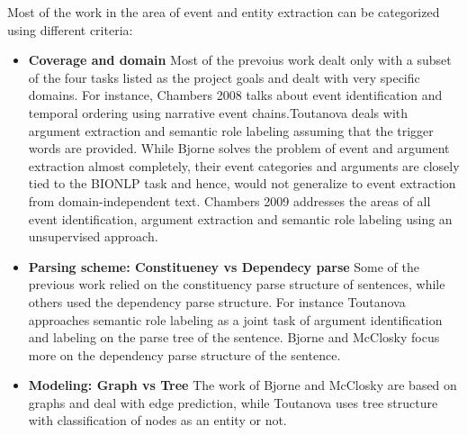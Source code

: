 Most of the work in the area of event and entity extraction can be categorized using different criteria:

\begin{itemize}

\item {\bf Coverage and domain} Most of the prevoius work dealt only with a subset of the four tasks listed as the project goals and dealt with very specific domains. For instance, Chambers 2008 talks about event identification and temporal ordering using narrative event chains.Toutanova deals with argument extraction and semantic role labeling assuming that the trigger words are provided. While Bjorne solves the problem of event and argument extraction almost completely, their event categories and arguments are closely tied to the BIONLP task and hence, would not generalize to event extraction from domain-independent text. Chambers 2009 addresses the areas of all event identification, argument extraction and semantic role labeling using an unsupervised approach.

\item {\bf Parsing scheme: Constitueney vs Dependecy parse} Some of the previous work relied on the constituency parse structure of sentences, while others used the dependency parse structure. For instance Toutanova approaches semantic role labeling as a joint task of argument identification and labeling on the parse tree of the sentence. Bjorne and McClosky focus more on the dependency parse structure of the sentence.

\item {\bf Modeling: Graph vs Tree} The work of Bjorne and McClosky are based on graphs and deal with edge prediction, while Toutanova uses tree structure with classification of nodes as an entity or not.

\end{itemize}
